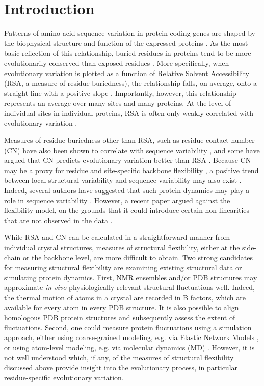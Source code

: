 \documentclass[smallextended]{svjour3}
\begin{document}
\section*{Introduction}

Patterns of amino-acid sequence variation in protein-coding genes are shaped by the biophysical structure and function of the expressed proteins
\citep{WilkeDrummond2010,MarshTeichmann2014}. As the most basic reflection of this relationship, buried residues in proteins tend to be more evolutionarily conserved than exposed residues
\citep{Overingtonetal1992,Goldmanetal1998,MirnyShakhnovich1999,Deanetal2002}. More specifically, when evolutionary variation is plotted as a function of Relative Solvent Accessibility (RSA, a measure of residue buriedness), the relationship falls, on average, onto a straight line with a positive slope \citep{FranzosaXia2009,Ramseyetal2011,FranzosaXia2012,Scherreretal2012}. Importantly, however, this relationship represents an average over many sites and many proteins. At the level of individual sites in individual proteins, RSA is often only weakly correlated with evolutionary variation \citep{MeyerWilke2013,Meyeretal2013,Yehetal2014}.

Measures of residue buriedness other than RSA, such as residue contact number (CN) have also been shown to correlate with sequence variability \citep{Liaoetal2005,FranzosaXia2009,Yehetal2014}, and some have argued that CN predicts evolutionary variation better than RSA \citep{Yehetal2014}. Because CN may be a proxy for residue and site-specific backbone flexibility \citep{Halle2002}, a positive trend between local structural variability and sequence variability may also exist \citep{Yehetal2014}. Indeed, several authors have suggested that such protein dynamics may play a role in sequence variability \citep{LiuBahar2012,NevinGereketal2013,MarshTeichmann2014}. However, a recent paper argued against the flexibility model, on the grounds that it could introduce certain non-linearities that are not observed in the data \citep{Huangetal2014}.

While RSA and CN can be calculated in a straightforward manner from individual crystal structures, measures of structural flexibility, either at the side-chain or the backbone level, are more difficult to obtain. Two strong candidates for measuring structural flexibility are examining existing structural data or simulating protein dynamics. First, NMR ensembles and/or PDB structures may approximate \emph{in vivo} physiologically relevant structural fluctuations well. Indeed, the thermal motion of atoms in a crystal are recorded in B factors, which are available for every atom in every PDB structure. It is also possible to align homologous PDB protein structures and subsequently assess the extent of fluctuations. Second, one could measure protein fluctuations using a simulation approach, either using coarse-grained modeling, e.g. via Elastic Network Models \citep{Sanejouand2013}, or using atom-level modeling, e.g. via molecular dynamics (MD) \citep{KarplusMcCammon2002}. However, it is not well understood which, if any, of the measures of structural flexibility discussed above provide insight into the evolutionary process, in particular residue-specific evolutionary variation.
\end{document}
